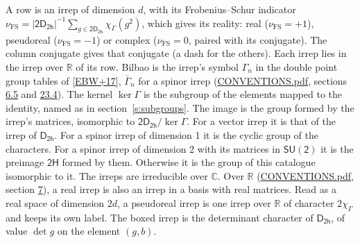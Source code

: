 \documentclass[10pt,a4paper]{article}
\numberwithin{equation}{section}
\newcommand{\grp}[1]{\mathsf{#1}}
\newcommand{\irchar}[1]{\chi_{#1}}
\newcommand{\fsind}{\nu_{\mathrm{FS}}}
\begin{document}
\leavevmode\label{n:index.frobenius}\label{n:head.irrep}\label{n:head.reality}A row is an irrep of dimension $d$, with its Frobenius--Schur indicator $\fsind = |\grp{2D_{2h}}|^{-1}\allowbreak\sum_{g\in\grp{2D_{2h}}}\irchar{\Gamma}(g^2)$, which gives its reality: real ($\fsind = +1$), pseudoreal ($\fsind = -1$) or complex ($\fsind = 0$, paired with its conjugate). \label{n:head.conjugate}The column conjugate gives that conjugate (a dash for the others). \label{n:head.over.real}Each irrep lies in the irrep over $\mathbb{R}$ of its row. \label{n:head.bilbao}\label{n:irrep.alias.gamma}Bilbao is the irrep's symbol $\Gamma_n$ in the double point group tables of [\href{../../../REFERENCES.pdf\#ref.EBW+17}{EBW+17}], $\bar{\Gamma}_n$ for a spinor irrep (\href{../../CONVENTIONS.pdf}{CONVENTIONS.pdf}, sections \href{../../../rotation/CONVENTIONS.pdf\#conv.6.5}{6.5} and \href{../../CONVENTIONS.pdf\#conv.23.4}{23.4}). \label{n:head.kernel}The kernel $\ker\Gamma$ is the subgroup of the elements mapped to the identity, named as in section~\ref{s:subgroups}. \label{n:head.image}The image is the group formed by the irrep's matrices, isomorphic to $\grp{2D_{2h}}/\ker\Gamma$. For a vector irrep it is that of the irrep of \href{../../../rotation/data/pdf/D2h.pdf}{$\grp{D_{2h}}$}. For a spinor irrep of dimension 1 it is the cyclic group of the characters. For a spinor irrep of dimension 2 with its matrices in $\grp{SU(2)}$ it is the preimage $\grp{2H}$ formed by them. Otherwise it is the group of this catalogue isomorphic to it. The irreps are irreducible over $\mathbb{C}$. Over $\mathbb{R}$ (\href{../../CONVENTIONS.pdf}{CONVENTIONS.pdf}, section \href{../../../rotation/CONVENTIONS.pdf\#conv.7}{7}), a real irrep is also an irrep in a basis with real matrices. Read as a real space of dimension $2d$, a pseudoreal irrep is one irrep over $\mathbb{R}$ of character $2\irchar{\Gamma}$ and keeps its own label. \label{n:mark.determinant}The boxed irrep is the determinant character of \href{../../../rotation/data/pdf/D2h.pdf}{$\grp{D_{2h}}$}, of value $\det g$ on the element $(g, b)$.
\setlength{\emergencystretch}{2em}\par\setlength{\emergencystretch}{0pt}
\end{document}

